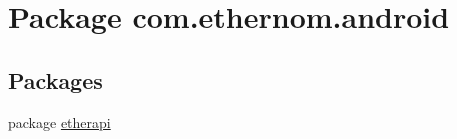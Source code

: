 \hypertarget{namespacecom_1_1ethernom_1_1android}{}\section{Package com.\+ethernom.\+android}
\label{namespacecom_1_1ethernom_1_1android}
\subsection*{Packages}
\begin{DoxyCompactItemize}
\item 
package \mbox{\hyperlink{namespacecom_1_1ethernom_1_1android_1_1etherapi}{etherapi}}
\end{DoxyCompactItemize}
